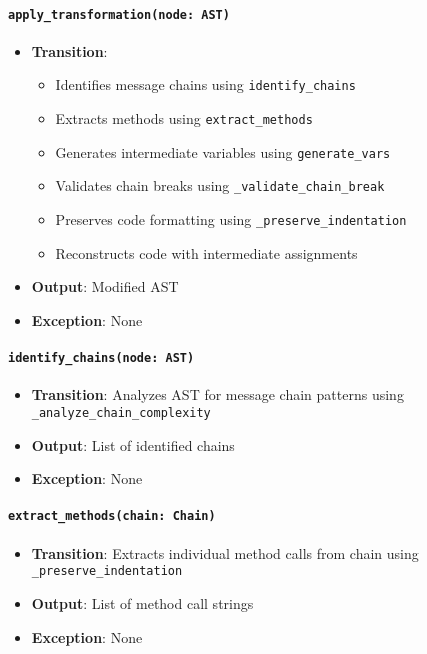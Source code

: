 \documentclass[12pt, titlepage]{article}
\begin{document}
\paragraph{\texttt{apply\_transformation(node: AST)}}
\begin{itemize}
  \item \textbf{Transition}:
    \begin{itemize}
      \item Identifies message chains using \texttt{identify\_chains}
      \item Extracts methods using \texttt{extract\_methods}
      \item Generates intermediate variables using \texttt{generate\_vars}
      \item Validates chain breaks using \texttt{\_validate\_chain\_break}
      \item Preserves code formatting using \texttt{\_preserve\_indentation}
      \item Reconstructs code with intermediate assignments
    \end{itemize}
  \item \textbf{Output}: Modified AST
  \item \textbf{Exception}: None
\end{itemize}

\paragraph{\texttt{identify\_chains(node: AST)}}
\begin{itemize}
  \item \textbf{Transition}: Analyzes AST for message chain patterns using \texttt{\_analyze\_chain\_complexity}
  \item \textbf{Output}: List of identified chains
  \item \textbf{Exception}: None
\end{itemize}

\paragraph{\texttt{extract\_methods(chain: Chain)}}
\begin{itemize}
  \item \textbf{Transition}: Extracts individual method calls from chain using \texttt{\_preserve\_indentation}
  \item \textbf{Output}: List of method call strings
  \item \textbf{Exception}: None
\end{itemize}
\end{document}
